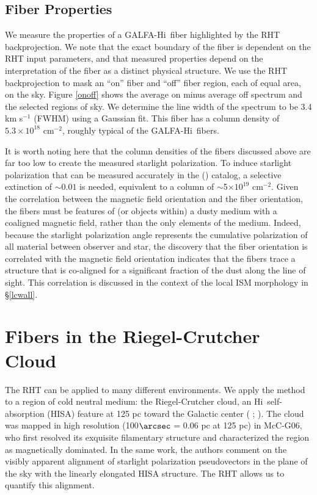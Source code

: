 \documentclass[12pt]{emulateapj}
\newcommand{\hi}{H{\sc i}~}
\newcommand{\citei}[1]{\citeauthor{#1} \citeyear{#1}}
\begin{document}
\subsection{Fiber Properties}\label{fiberprop}

We measure the properties of a GALFA-\hi fiber highlighted by the RHT backprojection. We note that the exact boundary of the fiber is dependent on the RHT input parameters, and that measured properties depend on the interpretation of the fiber as a distinct physical structure. 
We use the RHT backprojection to mask an ``on'' fiber and ``off'' fiber region, each of equal area, on the sky. Figure \ref{onoff} shows the average on minus average off spectrum and the selected regions of sky. We determine the line width of the spectrum to be 3.4 km s$^{-1}$ (FWHM) using a Gaussian fit. This fiber has a column density of $5.3 \times 10^{18}$ cm$^{-2}$, roughly typical of the GALFA-\hi fibers.

It is worth noting here that the column densities of the fibers discussed above are far too low to create the measured starlight polarization. To induce starlight polarization that can be measured accurately in the \citeauthor{Heiles:2000un} (\citeyear{Heiles:2000un}) catalog, a selective extinction of $\sim0.01$ is needed, equivalent to a column of $\sim$5$ \times 10^{19}$ cm$^{-2}$. Given the correlation between the magnetic field orientation and the fiber orientation, the fibers must be features of (or objects within) a dusty medium with a coaligned magnetic field, rather than the only elements of the medium. Indeed, because the starlight polarization angle represents the cumulative polarization of all material between observer and star, the discovery that the fiber orientation is correlated with the magnetic field orientation indicates that the fibers trace a structure that is co-aligned for a significant fraction of the dust along the line of sight. This correlation is discussed in the context of the local ISM morphology in \S \ref{lcwall}.

\section{Fibers in the Riegel-Crutcher Cloud}\label{rccloud}

The RHT can be applied to many different environments. We apply the method to a region of cold neutral medium: the Riegel-Crutcher cloud, an \hi self-absorption (HISA) feature at 125 pc toward the Galactic center (\citei{Heeschen:1955wi}; \citei{Riegel:1972wk}). The cloud was mapped in high resolution (100${\arcsec}$ = 0.06 pc at 125 pc) in McC-G06, who first resolved its exquisite filamentary structure and characterized the region as magnetically dominated. In the same work, the authors comment on the visibly apparent alignment of starlight polarization pseudovectors in the plane of the sky with the linearly elongated HISA structure. The RHT allows us to quantify this alignment.
\end{document}
